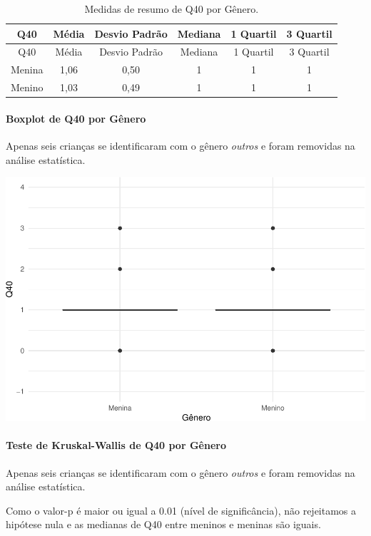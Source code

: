 \documentclass[]{article}
\let\oldparagraph\paragraph
\renewcommand{\paragraph}[1]{\oldparagraph{#1}\mbox{}}
\begin{document}
\begin{longtable}[]{@{}cccccc@{}}
\caption{\label{tab:unnamed-chunk-1560}Medidas de resumo de Q40 por Gênero.}\tabularnewline
\toprule
Q40 & Média & Desvio Padrão & Mediana & 1 Quartil & 3 Quartil\tabularnewline
\midrule
\endfirsthead
\toprule
Q40 & Média & Desvio Padrão & Mediana & 1 Quartil & 3 Quartil\tabularnewline
\midrule
\endhead
Menina & 1,06 & 0,50 & 1 & 1 & 1\tabularnewline
Menino & 1,03 & 0,49 & 1 & 1 & 1\tabularnewline
\bottomrule
\end{longtable}

\hypertarget{boxplot-de-q40-por-guxeanero}{%
\paragraph{Boxplot de Q40 por Gênero}\label{boxplot-de-q40-por-guxeanero}}

Apenas seis crianças se identificaram com o gênero \emph{outros} e foram removidas na análise estatística.

\begin{center}\includegraphics[width=0.75\linewidth]{relatorio_covid19_files/figure-latex/unnamed-chunk-1561-1} \end{center}

\hypertarget{teste-de-kruskal-wallis-de-q40-por-guxeanero}{%
\paragraph{Teste de Kruskal-Wallis de Q40 por Gênero}\label{teste-de-kruskal-wallis-de-q40-por-guxeanero}}

Apenas seis crianças se identificaram com o gênero \emph{outros} e foram removidas na análise estatística.

Como o valor-p é maior ou igual a 0.01 (nível de significância), não rejeitamos a hipótese nula e as medianas de Q40 entre meninos e meninas são iguais.
\end{document}
